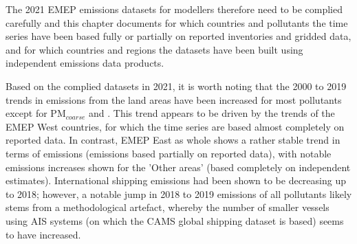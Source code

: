 The 2021 EMEP emissions datasets for modellers therefore need to be complied carefully and this chapter documents for which countries and pollutants the time series have been based fully or partially on reported inventories and gridded data, and for which countries and regions the datasets have been built using independent emissions data products.

Based on the complied datasets in 2021, it is worth noting that the 2000 to 2019 trends in emissions from the land areas have been increased for most pollutants except for PM$_{coarse}$  and \nhiii. This trend appears to be driven by the trends of the EMEP West countries, for which the time series are based almost completely on reported data. In contrast, EMEP East as whole shows a rather stable trend in terms of emissions (emissions based partially on reported data), with notable emissions increases shown for the 'Other areas' (based completely on independent estimates). International shipping emissions had been shown to be decreasing up to 2018; however, a notable jump in 2018  to 2019 emissions of all pollutants likely stems from a methodological artefact, whereby the number of smaller vessels using AIS systems (on which the CAMS global shipping dataset is based) seems to have increased.

\clearpage
\renewcommand\bibname{References}      %

